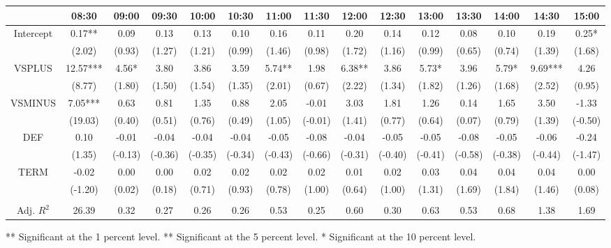\begin{table}[h]
\begin{threeparttable}
\begin{tabular}{ccccccccccccccc}
\toprule
                & 08:30    & 09:00   & 09:30   & 10:00   & 10:30   & 11:00   & 11:30   & 12:00   & 12:30   & 13:00   & 13:30   & 14:00   & 14:30   & 15:00   \\ \midrule
Intercept       & 0.17**   & 0.09    & 0.13    & 0.13    & 0.10    & 0.16    & 0.11    & 0.20    & 0.14    & 0.12    & 0.08    & 0.10    & 0.19    & 0.25*   \\
                & (2.02)   & (0.93)  & (1.27)  & (1.21)  & (0.99)  & (1.46)  & (0.98)  & (1.72)  & (1.16)  & (0.99)  & (0.65)  & (0.74)  & (1.39)  & (1.68)  \\
VSPLUS          & 12.57*** & 4.56*   & 3.80    & 3.86    & 3.59    & 5.74**  & 1.98    & 6.38**  & 3.86    & 5.73*   & 3.96    & 5.79*   & 9.69*** & 4.26    \\
                & (8.77)   & (1.80)  & (1.50)  & (1.54)  & (1.35)  & (2.01)  & (0.67)  & (2.22)  & (1.34)  & (1.82)  & (1.26)  & (1.68)  & (2.52)  & (0.95)  \\
VSMINUS         & 7.05***  & 0.63    & 0.81    & 1.35    & 0.88    & 2.05    & -0.01   & 3.03    & 1.81    & 1.26    & 0.14    & 1.65    & 3.50    & -1.33   \\
                & (19.03)  & (0.40)  & (0.51)  & (0.76)  & (0.49)  & (1.05)  & (-0.01) & (1.41)  & (0.77)  & (0.64)  & (0.07)  & (0.79)  & (1.39)  & (-0.50) \\
DEF             & 0.10     & -0.01   & -0.04   & -0.04   & -0.04   & -0.05   & -0.08   & -0.04   & -0.05   & -0.05   & -0.08   & -0.05   & -0.06   & -0.24   \\
                & (1.35)   & (-0.13) & (-0.36) & (-0.35) & (-0.34) & (-0.43) & (-0.66) & (-0.31) & (-0.40) & (-0.41) & (-0.58) & (-0.38) & (-0.44) & (-1.47) \\
TERM            & -0.02    & 0.00    & 0.00    & 0.02    & 0.02    & 0.02    & 0.02    & 0.01    & 0.02    & 0.03    & 0.04    & 0.04    & 0.04    & 0.00    \\
                & (-1.20)  & (0.02)  & (0.18)  & (0.71)  & (0.93)  & (0.78)  & (1.00)  & (0.64)  & (1.00)  & (1.31)  & (1.69)  & (1.84)  & (1.46)  & (0.08)  \\
                &          &         &         &         &         &         &         &         &         &         &         &         &         &         \\
 Adj. $R^{2}$  & 26.39    & 0.32    & 0.27    & 0.26    & 0.26    & 0.53    & 0.25    & 0.60    & 0.30    & 0.63    & 0.53    & 0.68    & 1.38    & 1.69     \\ 
\bottomrule
\end{tabular}

\begin{tablenotes}
\item *** Significant at the 1 percent level.    
** Significant at the 5 percent level.   
* Significant at the 10 percent level.
\end{tablenotes}

\end{threeparttable}

\end{table}
